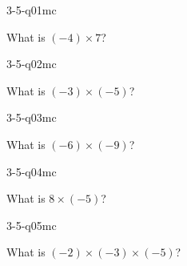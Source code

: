 

\begin{practiceQuestion}{3-5-q01}{mc}
\begin{questionText}
What is $(-4) \times 7$?
\end{questionText}
\end{practiceQuestion}

\begin{practiceQuestion}{3-5-q02}{mc}
\begin{questionText}
What is $(-3) \times (-5)$?
\end{questionText}
\end{practiceQuestion}

\begin{practiceQuestion}{3-5-q03}{mc}
\begin{questionText}
What is $(-6) \times (-9)$?
\end{questionText}
\end{practiceQuestion}

\begin{practiceQuestion}{3-5-q04}{mc}
\begin{questionText}
What is $8 \times (-5)$?
\end{questionText}
\end{practiceQuestion}

\begin{practiceQuestion}{3-5-q05}{mc}
\begin{questionText}
What is $(-2) \times (-3) \times (-5)$?
\end{questionText}
\end{practiceQuestion}

